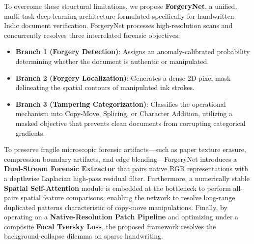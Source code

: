 \documentclass[pdflatex,sn-mathphys-num,iicol]{sn-jnl}
\begin{document}
To overcome these structural limitations, we propose \textbf{ForgeryNet}, a unified, multi-task deep learning architecture formulated specifically for handwritten Indic document verification. ForgeryNet processes high-resolution scans and concurrently resolves three interrelated forensic objectives:
\begin{itemize}
    \item \textbf{Branch 1 (Forgery Detection)}: Assigns an anomaly-calibrated probability determining whether the document is authentic or manipulated.
    \item \textbf{Branch 2 (Forgery Localization)}: Generates a dense 2D pixel mask delineating the spatial contours of manipulated ink strokes.
    \item \textbf{Branch 3 (Tampering Categorization)}: Classifies the operational mechanism into Copy-Move, Splicing, or Character Addition, utilizing a masked objective that prevents clean documents from corrupting categorical gradients.
\end{itemize}

To preserve fragile microscopic forensic artifacts---such as paper texture erasure, compression boundary artifacts, and edge blending---ForgeryNet introduces a \textbf{Dual-Stream Forensic Extractor} that pairs native RGB representations with a depthwise Laplacian high-pass residual filter. Furthermore, a numerically stable \textbf{Spatial Self-Attention} module is embedded at the bottleneck to perform all-pairs spatial feature comparisons, enabling the network to resolve long-range duplicated patterns characteristic of copy-move manipulations. Finally, by operating on a \textbf{Native-Resolution Patch Pipeline} and optimizing under a composite \textbf{Focal Tversky Loss}, the proposed framework resolves the background-collapse dilemma on sparse handwriting.
\end{document}
